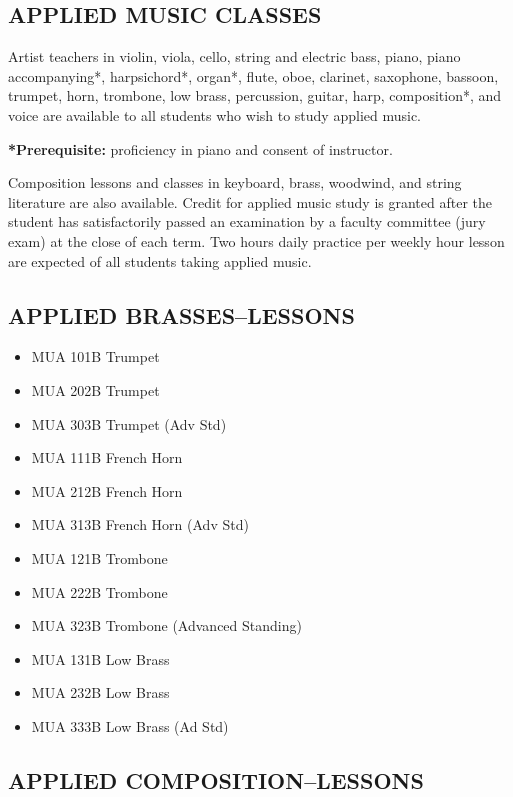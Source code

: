 \documentclass[
  letterpaper,
]{scrbook}
\providecommand{\tightlist}{%
  \setlength{\itemsep}{0pt}\setlength{\parskip}{0pt}}
\begin{document}
\subsection{APPLIED MUSIC CLASSES}\label{sec-MUA-classes}

Artist teachers in violin, viola, cello, string and electric bass,
piano, piano accompanying*, harpsichord*, organ*, flute, oboe, clarinet,
saxophone, bassoon, trumpet, horn, trombone, low brass, percussion,
guitar, harp, composition*, and voice are available to all students who
wish to study applied music.

\textbf{*Prerequisite:} proficiency in piano and consent of instructor.

Composition lessons and classes in keyboard, brass, woodwind, and string
literature are also available. Credit for applied music study is granted
after the student has satisfactorily passed an examination by a faculty
committee (jury exam) at the close of each term. Two hours daily
practice per weekly hour lesson are expected of all students taking
applied music.

\subsection{APPLIED BRASSES--LESSONS}\label{applied-brasseslessons}

\begin{itemize}
\tightlist
\item
  MUA 101B Trumpet
\item
  MUA 202B Trumpet
\item
  MUA 303B Trumpet (Adv Std)
\item
  MUA 111B French Horn
\item
  MUA 212B French Horn
\item
  MUA 313B French Horn (Adv Std)
\item
  MUA 121B Trombone
\item
  MUA 222B Trombone
\item
  MUA 323B Trombone (Advanced Standing)
\item
  MUA 131B Low Brass
\item
  MUA 232B Low Brass
\item
  MUA 333B Low Brass (Ad Std)
\end{itemize}

\subsection{APPLIED
COMPOSITION--LESSONS}\label{applied-compositionlessons}
\end{document}
